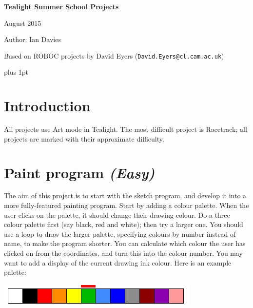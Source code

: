 \documentclass[12pt,a4paper,twoside]{article}
\renewcommand{\_}{\texttt{\symbol{95}}}
\begin{document}
\centerline{\textbf{\LARGE Tealight Summer School Projects}}
\vspace{0.5cm}
\centerline{August 2015}
\centerline{Author: Ian Davies}
\centerline{Based on ROBOC projects by David Eyers (\texttt{David.Eyers@cl.cam.ac.uk})}

{ \parskip 1mm plus 1pt \tableofcontents }

\section*{Introduction}

All projects use Art mode in Tealight.
The most difficult project is Racetrack; all projects are marked with
their approximate difficulty.

\newpage
\section{Paint program \it{(Easy)}}

The aim of this project is to start with the sketch program, and
develop it into a more fully-featured painting program. Start by
adding a colour palette. When the user clicks on the palette, it
should change their drawing colour. Do a three colour palette
first (say black, red and white); then try a larger one. You
should use a loop to draw the larger palette, specifying colours
by number instead of name, to make the program shorter. You can
calculate which colour the user has clicked on from the coordinates,
and turn this into the colour number. You may want to add a display
of the current drawing ink colour. Here is an example palette:

\begin{center}
\includegraphics[scale=0.6,angle=0]{screenshots/artpixel/paint/palette}
\end{center}
\end{document}
